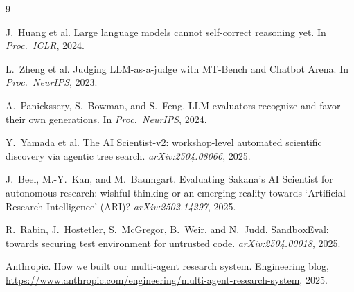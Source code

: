 \documentclass[11pt]{article}
\begin{document}
\begin{thebibliography}{9}
\small

J.~Huang et al.
\newblock Large language models cannot self-correct reasoning yet.
\newblock In \emph{Proc.\ ICLR}, 2024.

L.~Zheng et al.
\newblock Judging LLM-as-a-judge with MT-Bench and Chatbot Arena.
\newblock In \emph{Proc.\ NeurIPS}, 2023.

A.~Panickssery, S.~Bowman, and S.~Feng.
\newblock LLM evaluators recognize and favor their own generations.
\newblock In \emph{Proc.\ NeurIPS}, 2024.

Y.~Yamada et al.
\newblock The AI Scientist-v2: workshop-level automated scientific discovery via agentic tree search.
\newblock \emph{arXiv:2504.08066}, 2025.

J.~Beel, M.-Y.~Kan, and M.~Baumgart.
\newblock Evaluating Sakana's AI Scientist for autonomous research: wishful thinking or an emerging reality towards `Artificial Research Intelligence' (ARI)?
\newblock \emph{arXiv:2502.14297}, 2025.

R.~Rabin, J.~Hostetler, S.~McGregor, B.~Weir, and N.~Judd.
\newblock SandboxEval: towards securing test environment for untrusted code.
\newblock \emph{arXiv:2504.00018}, 2025.

Anthropic.
\newblock How we built our multi-agent research system.
\newblock Engineering blog, \url{https://www.anthropic.com/engineering/multi-agent-research-system}, 2025.

\end{thebibliography}
\end{document}
